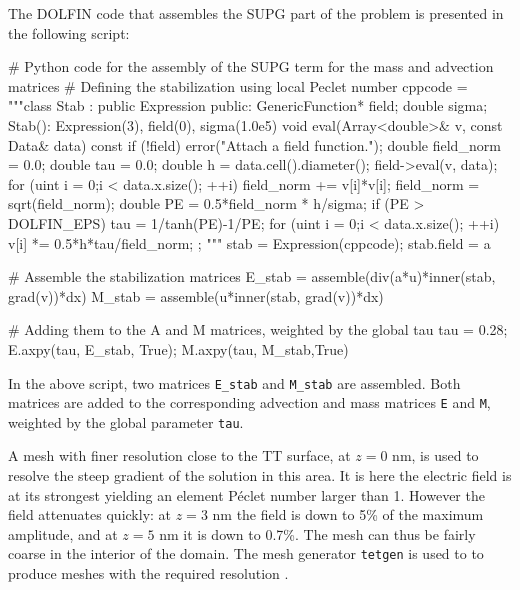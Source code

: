 The DOLFIN code that assembles the SUPG part of the problem is
presented in the following script:
\begin{python}
# Python code for the assembly of the SUPG term for the mass and advection matrices
# Defining the stabilization using local Peclet number
cppcode = """class Stab : public Expression {
public:
  GenericFunction* field; double sigma;
  Stab(): Expression(3), field(0), sigma(1.0e5){}
  void eval(Array<double>& v, const Data& data) const {
    if (!field)
      error("Attach a field function.");
    double field_norm = 0.0; double tau = 0.0;
    double h = data.cell().diameter();
    field->eval(v, data);
    for (uint i = 0;i < data.x.size(); ++i)
      field_norm += v[i]*v[i];
    field_norm = sqrt(field_norm);
    double PE = 0.5*field_norm * h/sigma;
    if (PE > DOLFIN_EPS)
      tau = 1/tanh(PE)-1/PE;
    for (uint i = 0;i < data.x.size(); ++i)
      v[i] *= 0.5*h*tau/field_norm;
}};
"""
stab = Expression(cppcode); stab.field = a

# Assemble the stabilization matrices
E_stab = assemble(div(a*u)*inner(stab, grad(v))*dx)
M_stab = assemble(u*inner(stab, grad(v))*dx)

# Adding them to the A and M matrices, weighted by the global tau
tau = 0.28; E.axpy(tau, E_stab, True); M.axpy(tau, M_stab,True)
\end{python}
In the above script, two matrices \texttt{E\_stab} and
\texttt{M\_stab} are assembled. Both matrices are added to the
corresponding advection and mass matrices \texttt{E} and \texttt{M},
weighted by the global parameter \texttt{tau}.

A mesh with finer resolution close to the TT surface, at $z=0$ nm, is
used to resolve the steep gradient of the solution in this area. It is
here the electric field is at its strongest yielding an element
P\'eclet number larger than 1. However the field attenuates quickly: at
$z=3$ nm the field is down to 5\% of the maximum amplitude, and at
$z=5$ nm it is down to 0.7\%. The mesh can thus be fairly coarse in
the interior of the domain. The mesh generator \texttt{tetgen} is used
to to produce meshes with the required resolution \citep{Si2007}.

